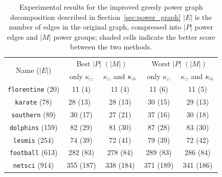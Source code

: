 \begin{table}
  \centering
  \caption[Experimental results on greedy power graph decomposition]{Experimental results for the improved greedy power graph decomposition described in Section~\ref{sec:power_graph}
  $|E|$ is the number of edges in the original graph, compressed into $|P|$ power edges and $|M|$ power groups; shaded cells indicate the better score between the two methods.}
  
  \setlength{\tabcolsep}{1em}
  \renewcommand{\arraystretch}{1.25}

  \begin{tabular}{ |c|c|c|c|c| } 
    \hline
    \multirow{2}{*}{Name ($|E|$)} &
    \multicolumn{2}{c|}{Best $|P|$ $(|M|)$} & \multicolumn{2}{c|}{Worst $|P|$ $(|M|)$} \\ 
    \cline{2-5}
    & only $\kappa_\cap$ & $\kappa_\cap$ and $\kappa_{\Triangle}$ & only $\kappa_\cap$ & $\kappa_\cap$ and $\kappa_{\Triangle}$ \\ 
    \hline\hline
    \texttt{florentine} (20)
       & 11 (4)
       & 11 (4)
       & 11 (6)
       &\cellcolor{grey} 11 (5) \\
    \texttt{karate} (78)
       & 28 (13)\
       & 28 (13)
       & 30 (15)
       &\cellcolor{grey} 29 (13)\\ 
    \texttt{southern} (89)
       & 30 (17)
       &\cellcolor{grey} 27 (21)
       & 37 (16)
       &\cellcolor{grey} 30 (18)\\ 
    \texttt{dolphins} (159)
       & 82 (29)
       &\cellcolor{grey} 81 (30)
       & 87 (28)
       &\cellcolor{grey} 83 (30)\\ 
    \texttt{lesmis} (254)
       & 74 (39)
       &\cellcolor{grey} 72 (41)
       & 79 (39)
       &\cellcolor{grey} 72 (42)\\
    \texttt{football} (613)
       & 282 (83)
       &\cellcolor{grey} 278 (84)
       & 289 (83)
       &\cellcolor{grey} 286 (84)\\
    \texttt{netsci} (914)
       & 355 (187)
       &\cellcolor{grey} 338 (184)
       & 371 (189)
       &\cellcolor{grey} 341 (186)\\
       
    \hline
  \end{tabular}
  \label{tab:pgd_results}
\end{table}


